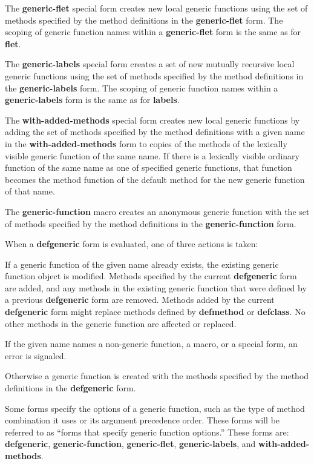 The {\bf generic-flet} special form creates new local generic
functions using the set of methods specified by the method definitions
in the {\bf generic-flet} form.  The scoping of generic function names
within a {\bf generic-flet} form is the same as for {\bf flet}.

The {\bf generic-labels} special form creates a set of new mutually
recursive local generic functions using the set of methods specified
by the method definitions in the {\bf generic-labels} form.  The
scoping of generic function names within a {\bf generic-labels} form
is the same as for {\bf labels}.

The {\bf with-added-methods} special form creates new local generic
functions by adding the set of methods specified by the method
definitions with a given name in the {\bf with-added-methods} form to
copies of the methods of the lexically visible generic function of the
same name. If there is a lexically visible ordinary function of the
same name as one of specified generic functions, that function
becomes the method function of the default method for the new generic
function of that name.

The {\bf generic-function} macro creates an anonymous generic
function with the set of methods specified by the method definitions
in the {\bf generic-function} form.

When a {\bf defgeneric} form is evaluated, one of three actions
is taken:

\beginlist

\item{\bull} If a generic function of the given name already exists,
the existing generic function object is modified.  Methods specified
by the current {\bf defgeneric} form are added, and any methods in the
existing generic function that were defined by a previous {\bf
defgeneric} form are removed.  Methods added by the current {\bf
defgeneric} form might replace methods defined by {\bf defmethod} or
{\bf defclass}.  No other methods in the generic function are affected
or replaced.

\item{\bull} If the given name names a non-generic function, a
macro, or a special form, an error is signaled.

\item{\bull} Otherwise a generic function is created with the
methods specified by the method definitions in the {\bf defgeneric}
form.

\endlist

Some forms specify the options of a generic function,
such as the type of method combination it uses or its argument
precedence order.  These forms will be referred to as ``forms that
specify generic function options.'' These forms are: {\bf defgeneric},
{\bf generic-function}, {\bf generic-flet}, {\bf generic-labels}, and
{\bf with-added-methods}.

